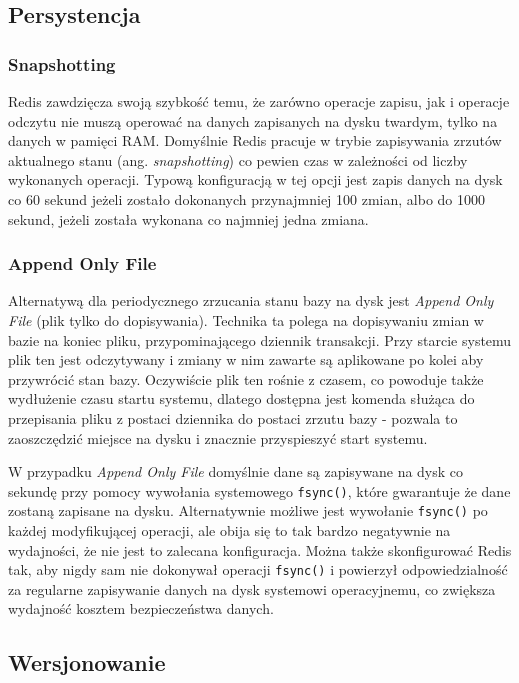 \subsection*{Persystencja}

\subsubsection*{Snapshotting}

Redis zawdzięcza swoją szybkość temu, że zarówno operacje zapisu, jak i operacje odczytu nie muszą operować na danych zapisanych na dysku twardym, tylko na danych w pamięci RAM.
Domyślnie Redis pracuje w trybie zapisywania zrzutów aktualnego stanu (ang. \emph{snapshotting}) co pewien czas w zależności od liczby wykonanych operacji.
Typową konfiguracją w tej opcji jest zapis danych na dysk co 60 sekund jeżeli zostało dokonanych przynajmniej 100 zmian, albo do 1000 sekund, jeżeli została wykonana co najmniej jedna zmiana.

\subsubsection*{Append Only File}

Alternatywą dla periodycznego zrzucania stanu bazy na dysk jest \emph{Append Only File} (plik tylko do dopisywania).
Technika ta polega na dopisywaniu zmian w bazie na koniec pliku, przypominającego dziennik transakcji.
Przy starcie systemu plik ten jest odczytywany i zmiany w nim zawarte są aplikowane po kolei aby przywrócić stan bazy.
Oczywiście plik ten rośnie z czasem, co powoduje także wydłużenie czasu startu systemu, dlatego dostępna jest komenda służąca do przepisania pliku z postaci dziennika do postaci zrzutu bazy - pozwala to zaoszczędzić miejsce na dysku i znacznie przyspieszyć start systemu.

W przypadku \emph{Append Only File} domyślnie dane są zapisywane na dysk co sekundę przy pomocy wywołania systemowego \verb+fsync()+, które gwarantuje że dane zostaną zapisane na dysku.
Alternatywnie możliwe jest wywołanie \verb+fsync()+ po każdej modyfikującej operacji, ale obija się to tak bardzo negatywnie na wydajności, że nie jest to zalecana konfiguracja.
Można także skonfigurować Redis tak, aby nigdy sam nie dokonywał operacji \verb+fsync()+ i powierzył odpowiedzialność za regularne zapisywanie danych na dysk systemowi operacyjnemu, co zwiększa wydajność kosztem bezpieczeństwa danych.

\subsection*{Wersjonowanie}

